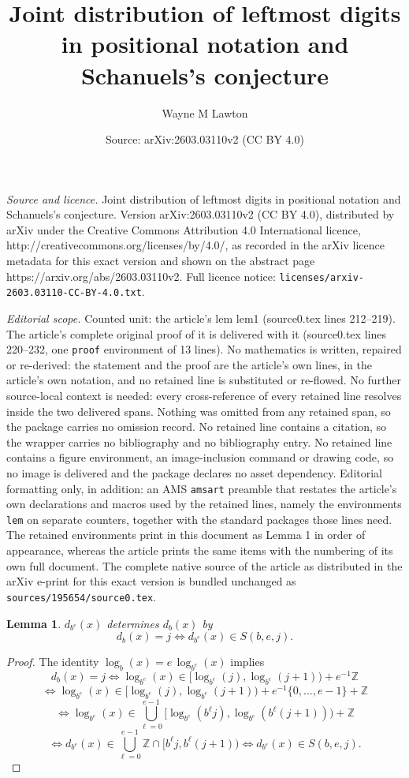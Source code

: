 \documentclass[10pt,a4paper]{amsart}
\title{Joint distribution of leftmost digits in positional notation and Schanuels's conjecture}
\author{Wayne M Lawton}
\date{Source: arXiv:2603.03110v2 (CC BY 4.0)}
\newtheorem{lem}{Lemma}
\begin{document}
\maketitle

\noindent\emph{Source and licence.} Joint distribution of leftmost digits in positional notation and Schanuels's conjecture. Version arXiv:2603.03110v2 (CC BY 4.0), distributed by arXiv under the Creative Commons Attribution 4.0 International licence, http://creativecommons.org/licenses/by/4.0/, as recorded in the arXiv licence metadata for this exact version and shown on the abstract page https://arxiv.org/abs/2603.03110v2. Full licence notice: \texttt{licenses/arxiv-2603.03110-CC-BY-4.0.txt}.\par\smallskip

\noindent\textit{Editorial scope.} Counted unit: the article's lem lem1 (source0.tex lines 212--219). The article's complete original proof of it is delivered with it (source0.tex lines 220--232, one \texttt{proof} environment of 13 lines). No mathematics is written, repaired or re-derived: the statement and the proof are the article's own lines, in the article's own notation, and no retained line is substituted or re-flowed.  No further source-local context is needed: every cross-reference of every retained line resolves inside the two delivered spans.  Nothing was omitted from any retained span, so the package carries no omission record.  No retained line contains a citation, so the wrapper carries no bibliography and no bibliography entry.  No retained line contains a figure environment, an image-inclusion command or drawing code, so no image is delivered and the package declares no asset dependency.  Editorial formatting only, in addition: an AMS \texttt{amsart} preamble that restates the article's own declarations and macros used by the retained lines, namely the environments \texttt{lem} on separate counters, together with the standard packages those lines need.  The retained environments print in this document as Lemma 1 in order of appearance, whereas the article prints the same items with the numbering of its own full document.  The complete native source of the article as distributed in the arXiv e-print for this exact version is bundled unchanged as \texttt{sources/195654/source0.tex}.
\begin{lem}\label{lem1}
$d_{b^e}(x)$ determines $d_b(x)$ by
%
\begin{equation}\label{eq3}
 d_b(x) = j \iff d_{b^e}(x) \in S(b,e,j).
\end{equation}
%
\end{lem}

\begin{proof}
The identity $\log_b(x) = e\, \log_{b^e}(x)$ implies
%
$$d_b(x) = j \iff  \log_{b^e}(x) \in [\log_{b^e}(j),\log_{b^e}(j+1)) + e^{-1}\mathbb Z$$
%
$$\iff \log_{b^e}(x) \in [\log_{b^e}(j),\log_{b^e}(j+1))+ e^{-1}\{0,...,e-1\} + \mathbb Z$$
%
$$\iff  \log_{b^e}(x) \in \bigcup_{\ell = 0}^{e-1} 
[\log_{b^e}(b^\ell j),\log_{b^e}(b^\ell (j+1))) + \mathbb Z$$
%
$$\iff  d_{b^e}(x) \in \bigcup_{\ell = 0}^{e-1} 
\mathbb Z \cap [b^\ell j,b^\ell (j+1)) \iff  d_{b^e}(x) \in S(b,e,j).$$
\end{proof}
\end{document}
